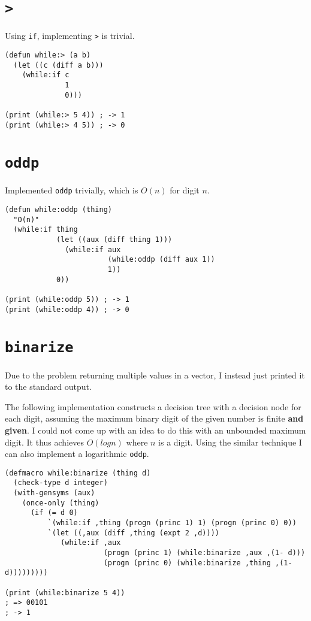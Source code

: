\documentclass{article}
\begin{document}
\section{\texttt{>}}
\label{sec:org209c9e2}

Using \texttt{if}, implementing \texttt{>} is trivial.

\lstset{language=Lisp,label= ,caption= ,captionpos=b,numbers=none}
\begin{lstlisting}
(defun while:> (a b)
  (let ((c (diff a b)))
    (while:if c
              1
              0)))

(print (while:> 5 4)) ; -> 1
(print (while:> 4 5)) ; -> 0
\end{lstlisting}

\section{\texttt{oddp}}
\label{sec:org88529c7}

Implemented \texttt{oddp} trivially, which is $O(n)$ for digit $n$.

\lstset{language=Lisp,label= ,caption= ,captionpos=b,numbers=none}
\begin{lstlisting}
(defun while:oddp (thing)
  "O(n)"
  (while:if thing
            (let ((aux (diff thing 1)))
              (while:if aux
                        (while:oddp (diff aux 1))
                        1))
            0))

(print (while:oddp 5)) ; -> 1
(print (while:oddp 4)) ; -> 0
\end{lstlisting}

\section{\texttt{binarize}}
\label{sec:orgbd31612}

Due to the problem returning multiple values in a vector, I instead just printed it to the standard output.

The following implementation constructs a decision tree with a decision
node for each digit, assuming the maximum binary digit of the given
number is finite \textbf{and given}. I could not come up with an idea to
do this with an unbounded maximum digit.  It thus achieves $O(log n)$
where $n$ is a digit. Using the similar technique I can also implement a
logarithmic \texttt{oddp}.

\lstset{language=Lisp,label= ,caption= ,captionpos=b,numbers=none}
\begin{lstlisting}
(defmacro while:binarize (thing d)
  (check-type d integer)
  (with-gensyms (aux)
    (once-only (thing)
      (if (= d 0)
          `(while:if ,thing (progn (princ 1) 1) (progn (princ 0) 0))
          `(let ((,aux (diff ,thing (expt 2 ,d))))
             (while:if ,aux
                       (progn (princ 1) (while:binarize ,aux ,(1- d)))
                       (progn (princ 0) (while:binarize ,thing ,(1- d)))))))))

(print (while:binarize 5 4))
; => 00101
; -> 1
\end{lstlisting}
\end{document}

